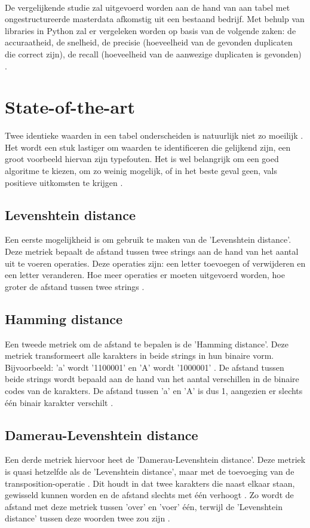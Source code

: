 \\\indent
De vergelijkende studie zal uitgevoerd worden aan de hand van aan tabel met ongestructureerde masterdata afkomstig uit een bestaand bedrijf. Met behulp van libraries in Python zal er vergeleken worden op basis van de volgende zaken: de accuraatheid, de snelheid, de precisie (hoeveelheid van de gevonden duplicaten die correct zijn), de recall (hoeveelheid van de aanwezige duplicaten is gevonden) \autocite{GoogleDevelopers2022}.


\section{State-of-the-art}%
\label{sec:state-of-the-art}

Twee identieke waarden in een tabel onderscheiden is natuurlijk niet zo moeilijk \autocite{Lievens2022}. Het wordt een stuk lastiger om waarden te identificeren die gelijkend zijn, een groot voorbeeld hiervan zijn typefouten. Het is wel belangrijk om een goed algoritme te kiezen, om zo weinig mogelijk, of in het beste geval geen, vals positieve uitkomsten te krijgen \autocite{Silva2022}.
\subsection{Levenshtein distance}
Een eerste mogelijkheid is om gebruik te maken van de 'Levenshtein distance'. Deze metriek bepaalt de afstand tussen twee strings aan de hand van het aantal uit te voeren operaties. Deze operaties zijn: een letter toevoegen of verwijderen en een letter veranderen. Hoe meer operaties er moeten uitgevoerd worden, hoe groter de afstand tussen twee strings \autocite{Wikiversity2022}.
\subsection{Hamming distance}
Een tweede metriek om de afstand te bepalen is de 'Hamming distance'. Deze metriek transformeert alle karakters in beide strings in hun binaire vorm. Bijvoorbeeld: 'a' wordt '1100001' en 'A' wordt '1000001' \autocite{Includehelp}. De afstand tussen beide strings wordt bepaald aan de hand van het aantal verschillen in de binaire codes van de karakters. De afstand tussen 'a' en 'A' is dus 1, aangezien er slechts één binair karakter verschilt \autocite{Silva2022}.
\subsection{Damerau-Levenshtein distance}
Een derde metriek hiervoor heet de 'Damerau-Levenshtein distance'. Deze metriek is quasi hetzelfde als de 'Levenshtein distance', maar met de toevoeging van de transposition-operatie \autocite{Wikiversity2022}. Dit houdt in dat twee karakters die naast elkaar staan, gewisseld kunnen worden en de afstand slechts met één verhoogt . Zo wordt de afstand met deze metriek tussen 'over' en 'voer' één, terwijl de 'Levenshtein distance' tussen deze woorden twee zou zijn \autocite{Pypi2020}.
